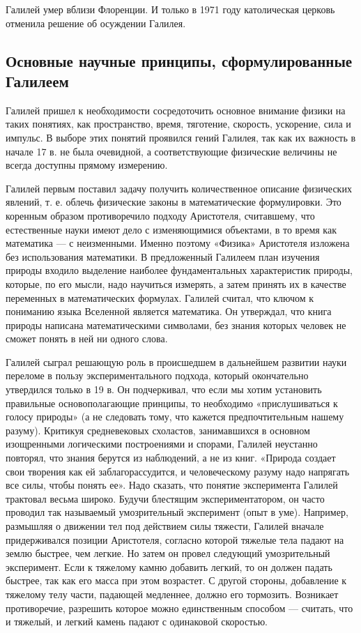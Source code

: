 \documentclass[a4paper, 14pt]{extreport}
\begin{document}
Галилей умер вблизи Флоренции. И только в 1971 году католическая церковь
отменила решение об осуждении Галилея.

\subsection{Основные научные принципы, сформулированные Галилеем}

Галилей пришел к необходимости сосредоточить основное внимание физики на
таких понятиях, как пространство, время, тяготение, скорость, ускорение,
сила и импульс. В выборе этих понятий проявился гений Галилея, так как
их важность в начале 17 в. не была очевидной, а соответствующие
физические величины не всегда доступны прямому измерению.

Галилей первым поставил задачу получить количественное описание
физических явлений, т. е. облечь физические законы в математические
формулировки. Это коренным образом противоречило подходу Аристотеля,
считавшему, что естественные науки имеют дело с изменяющимися объектами,
в то время как математика --- с неизменными. Именно поэтому «Физика»
Аристотеля изложена без использования математики. В предложенный
Галилеем план изучения природы входило выделение наиболее
фундаментальных характеристик природы, которые, по его мысли, надо
научиться измерять, а затем принять их в качестве переменных в
математических формулах. Галилей считал, что ключом к пониманию языка
Вселенной является математика. Он утверждал, что книга природы написана
математическими символами, без знания которых человек не сможет понять в
ней ни одного слова.

Галилей сыграл решающую роль в происшедшем в дальнейшем развитии науки
переломе в пользу экспериментального подхода, который окончательно
утвердился только в 19 в. Он подчеркивал, что если мы хотим установить
правильные основополагающие принципы, то необходимо «прислушиваться к
голосу природы» (а не следовать тому, что кажется предпочтительным
нашему разуму). Критикуя средневековых схоластов, занимавшихся в
основном изощренными логическими построениями и спорами, Галилей
неустанно повторял, что знания берутся из наблюдений, а не из книг.
«Природа создает свои творения как ей заблагорассудится, и человеческому
разуму надо напрягать все силы, чтобы понять ее». Надо сказать, что
понятие эксперимента Галилей трактовал весьма широко. Будучи блестящим
экспериментатором, он часто проводил так называемый умозрительный
эксперимент (опыт в уме). Например, размышляя о движении тел под
действием силы тяжести, Галилей вначале придерживался позиции
Аристотеля, согласно которой тяжелые тела падают на землю быстрее, чем
легкие. Но затем он провел следующий умозрительный эксперимент. Если к
тяжелому камню добавить легкий, то он должен падать быстрее, так как его
масса при этом возрастет. С другой стороны, добавление к тяжелому телу
части, падающей медленнее, должно его тормозить. Возникает противоречие,
разрешить которое можно единственным способом --- считать, что и
тяжелый, и легкий камень падают с одинаковой скоростью.
\end{document}
